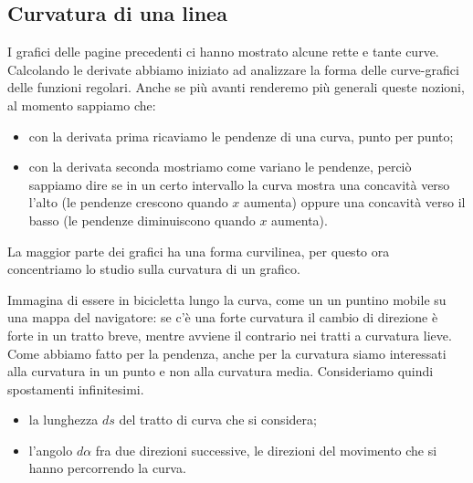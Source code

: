 \subsection{Curvatura di una linea}
I grafici delle pagine precedenti ci hanno mostrato alcune rette e tante curve. 
Calcolando le derivate abbiamo iniziato ad analizzare la forma delle 
curve-grafici delle funzioni regolari. Anche se più avanti renderemo più 
generali queste nozioni, al momento sappiamo che:
\begin{itemize}[nosep]
 \item con la derivata prima ricaviamo le pendenze di una curva, punto per 
punto;
\item con la derivata seconda mostriamo come variano le pendenze, perciò 
sappiamo dire se in un certo intervallo la curva mostra una concavità 
verso l'alto (le pendenze crescono quando \(x\) aumenta) oppure una 
concavità verso il basso (le pendenze diminuiscono quando \(x\) aumenta).
\end{itemize}
La maggior parte dei grafici ha una forma curvilinea, per questo ora 
concentriamo lo studio sulla curvatura di un grafico. 

Immagina di essere in 
bicicletta lungo la curva, come un un puntino mobile su una mappa del 
navigatore: se c'è una forte curvatura il cambio di direzione è forte in un 
tratto breve, mentre avviene il contrario nei tratti a curvatura lieve. 
Come abbiamo fatto per la pendenza, anche per la curvatura siamo interessati 
alla curvatura in un punto e non alla curvatura media. Consideriamo quindi 
spostamenti infinitesimi.
\begin{itemize}[nosep]
\item la lunghezza \(ds\) del tratto di curva che si considera;
 \item l'angolo \(d\alpha\) fra due direzioni successive, le direzioni del 
movimento che si hanno percorrendo la curva.
\end{itemize}



